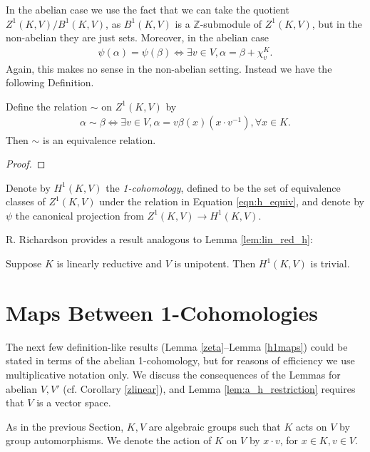 In the abelian case we use the fact that we can take the quotient $Z^1(K, V)/B^1(K, V)$, as $B^1(K, V)$ is a $\mathbb{Z}$-submodule of $Z^1(K, V)$, but in the non-abelian they are just sets. Moreover, in the abelian case
\begin{align*}
	\psi(\alpha) = \psi(\beta) \Leftrightarrow \exists v \in V, \alpha = \beta + \chi^K_v.
\end{align*}
Again, this makes no sense in the non-abelian setting. Instead we have the following Definition.

\begin{lemma} Define the relation $\sim$ on $Z^1(K, V)$ by
	\begin{align}
		\alpha \sim \beta \Leftrightarrow \exists v \in V, \alpha = v\beta(x)(x \cdot v^{-1}), \forall x \in K.
		\label{eqn:h_equiv}
	\end{align}
Then $\sim$ is an equivalence relation.
\end{lemma}
\begin{proof}
\end{proof}

\begin{definition}
Denote by $H^1(K, V)$ the \emph{1-cohomology}, defined to be the set of equivalence classes of $Z^1(K, V)$ under the relation in Equation \ref{eqn:h_equiv}, and denote by $\psi$ the canonical projection from $Z^1(K, V) \rightarrow H^1(K, V)$.
\end{definition}

R. Richardson \cite[Lemma 6.2.6]{richardson1982orbits} provides a result analogous to Lemma \ref{lem:lin_red_h}:
\begin{lemma}
  Suppose $K$ is linearly reductive and $V$ is unipotent. Then $H^1(K, V)$ is trivial.
  \label{lem:nonab_lin_red}
\end{lemma}

\section{Maps Between 1-Cohomologies}

The next few definition-like results (Lemma \ref{zeta}--Lemma \ref{h1maps}) could be stated in terms of the abelian 1-cohomology, but for reasons of efficiency we use multiplicative notation only. We discuss the consequences of the Lemmas for abelian $V, V'$ (cf. Corollary \ref{zlinear}), and Lemma \ref{lem:a_h_restriction} requires that $V$ is a vector space.

As in the previous Section, $K, V$ are algebraic groups such that $K$ acts on $V$ by group automorphisms. We denote the action of $K$ on $V$ by $x \cdot v$, for $x \in K, v \in V$.

